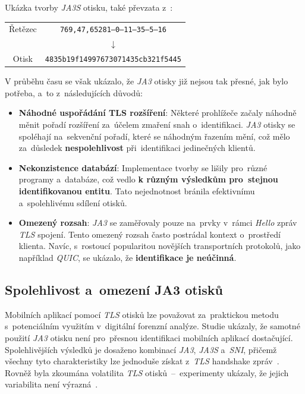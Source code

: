 Ukázka tvorby \textit{JA3S} otisku, také převzata z~\cite{Althouse2022JA3}:
\begin{table}[H]
	\centering
	\begin{tabular}{c|c}
		Řetězec & \verb|769,47,65281–0–11–35–5–16| \\        
		          & $\downarrow$                               \\
		Otisk     & \verb|4835b19f14997673071435cb321f5445|    \\ 
	\end{tabular}
\end{table}

V průběhu času se však ukázalo, že \textit{JA3} otisky již nejsou tak přesné, jak bylo potřeba, a~to z~následujících důvodů:
\begin{itemize}
	\item \textbf{Náhodné uspořádání TLS rozšíření}: Některé prohlížeče začaly náhodně měnit pořadí rozšíření za~účelem zmaření snah o~identifikaci. \textit{JA3} otisky se spoléhají na~sekvenční pořadí, které se náhodným řazením mění, což mělo za~důsledek \textbf{nespolehlivost} při~identifikaci jedinečných klientů.
	\item \textbf{Nekonzistence databází}: Implementace tvorby se lišily pro~různé programy a~databáze, což vedlo \textbf{k různým výsledkům pro~stejnou identifikovanou entitu}. Tato nejednotnost bránila efektivnímu a~spolehlivému sdílení otisků.
	\item \textbf{Omezený rozsah}: \textit{JA3} se zaměřovaly pouze na~prvky v~rámci \textit{Hello} zpráv \textit{TLS} spojení. Tento omezený rozsah často postrádal kontext o~prostředí klienta. Navíc, s~rostoucí popularitou novějších transportních protokolů, jako například \textit{QUIC}, se ukázalo, že \textbf{identifikace je neúčinná}.
\end{itemize}

\subsection{Spolehlivost a~omezení JA3 otisků}
Mobilních aplikací pomocí \textit{TLS} otisků lze považovat za~praktickou metodu s~potenciálním využitím v~digitální forenzní analýze. Studie ukázaly, že samotné použití \textit{JA3} otisku není pro~přesnou identifikaci mobilních aplikací dostačující. Spolehlivějších výsledků je dosaženo kombinací \textit{JA3}, \textit{JA3S} a~\textit{SNI}, přičemž všechny tyto charakteristiky lze jednoduše získat z~\textit{TLS} handshake zpráv~\cite{MatousekMobileDevice2020}. Rovněž byla zkoumána volatilita \textit{TLS} otisků \,--\, experimenty ukázaly, že jejich variabilita není výrazná~\cite{MatousekJA3Reliability2020}.

